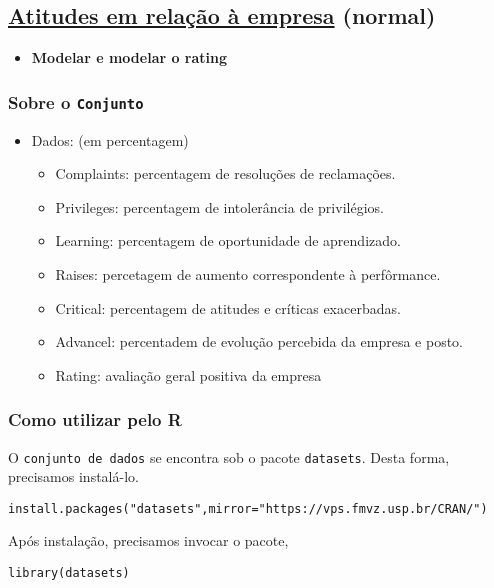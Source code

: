 \documentclass[11pt]{article}
\begin{document}
\subsection{\href{https://r-data.pmagunia.com/dataset/r-dataset-package-datasets-attitude}{Atitudes em relação à empresa} (normal)}
\label{sec:orgc506afe}
\begin{itemize}
\item \textbf{Modelar e modelar o rating}
\end{itemize}
\subsubsection{Sobre o \texttt{Conjunto}}
\label{sec:orgd8a7914}
\begin{itemize}
\item Dados: (em percentagem)
\begin{itemize}
\item Complaints: percentagem de resoluções de reclamações.
\item Privileges: percentagem de intolerância de privilégios.
\item Learning: percentagem de oportunidade de aprendizado.
\item Raises: percetagem de aumento correspondente à perfôrmance.
\item Critical: percentagem de atitudes e críticas exacerbadas.
\item Advancel: percentadem de evolução percebida da empresa e posto.
\item Rating: avaliação geral positiva da empresa
\end{itemize}
\end{itemize}

\subsubsection{Como utilizar pelo R}
\label{sec:org3e221e4}
O \texttt{conjunto de dados} se encontra sob o pacote \texttt{datasets}. Desta forma, precisamos
instalá-lo.

\begin{verbatim}
install.packages("datasets",mirror="https://vps.fmvz.usp.br/CRAN/")
\end{verbatim}

Após instalação, precisamos invocar o pacote,
\begin{verbatim}
library(datasets)
\end{verbatim}
\end{document}
